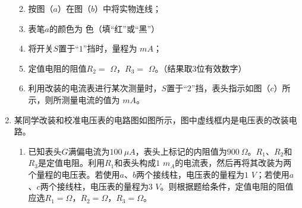 \begin{enumerate}[leftmargin=0em]
\begin{enumerate}
\renewcommand{\labelenumi}{\arabic{enumi}.}
\item
按图（$ a $）在图（$ b $）中将实物连线；
\item 
表笔$ a $的颜色为  色（填“红”或“黑”）
\item 
将开关$ S $置于“$ 1 $”挡时，量程为  $ m{A} $；
\item 
定值电阻的阻值$ R_{2} = $  $ \Omega $，$ R_3= $  $ \Omega $。（结果取$ 3 $位有效数字）
\item 
利用改装的电流表进行某次测量时，$ S $置于“$ 2 $”挡，表头指示如图（$ c $）所示，则所测量电流的值为  $ m{A} $。



\end{enumerate}






\newpage
\item 
{}
某同学改装和校准电压表的电路图如图所示，图中虚线框内是电压表的改装电路。

\begin{enumerate}
\renewcommand{\labelenumi}{\arabic{enumi}.}
\item
已知表头$ G $满偏电流为$ 100 \ \mu A $，表头上标记的内阻值为$ 900 \ \Omega $。$ R_{1} $、$ R_{2} $和$ R_{3} $是定值电阻。利用$ R_{1} $和表头构成$ 1 $ $ m_{A} $的电流表，然后再将其改装为两个量程的电压表。若使用$ a $、$ b $两个接线柱，电压表的量程为$ 1 $ $ V $；若使用$ a $、$ c $两个接线柱，电压表的量程为$ 3 $ $ V $。则根据题给条件，定值电阻的阻值应选$ R_{1} = $$\Omega $，$ R_{2} =$$\Omega $，$ R_3= $$\Omega $。
\begin{figure}[h!]
\centering

\end{figure}


\end{enumerate}
\end{enumerate}
